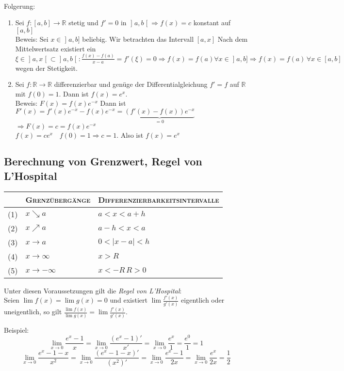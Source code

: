\documentclass[ngerman,titlepage,twoside, parskip=half*]{scrreprt}
\newcommand*{\R}{\mathbb{R}}
\theoremstyle{plain}
\theoremstyle{definition}
\theoremstyle{remark}
\newcommand*{\lsofint}[1]{\mathopen{]}#1]}   %
\newcommand*{\bsofint}[1]{\mathopen{]}#1\mathclose{[}} %
\begin{document}
Folgerung:
\begin{enumerate}[(1)]
  \item Sei $f\colon[a,b]\rightarrow\R$ stetig und $f'=0$ in $\bsofint{a,b}
    \Rightarrow f(x)=c$ konstant auf $[a,b]$\\
    Beweis: Sei $x\in\lsofint{a,b}$ beliebig. Wir betrachten das Intervall $[a,x]$
    Nach dem Mittelwertsatz existiert ein $\xi\in\bsofint{a,x}\subset\bsofint{a,b}\colon
    \frac{f(x)-f(a)}{x-a}=f'(\xi)=0\Rightarrow f(x)=f(a) \forall x\in
    \lsofint{a,b}\Rightarrow f(x)=f(a)\,\forall x\in[a,b]$ wegen der Stetigkeit.
  \item Sei $f\colon\R\rightarrow\R$ differenzierbar und genüge der
    Differentialgleichung $f'=f$ auf $\R$ mit $f(0)=1$. Dann ist
    $f(x)=e^x$.\\
    Beweis: $F(x)=f(x)e^{-x}$ Dann ist $F'(x)=f'(x)e^{-x}-f(x)e^{-x}=
    \underbrace{(f'(x)-f(x))e^{-x}}_{=0}$\\
    $\Rightarrow F(x)=c=f(x)e^{-x}$\\
    $f(x)=ce^x\quad f(0)=1\Rightarrow c=1$. Also ist $f(x)=e^x$
\end{enumerate}

\subsection{Berechnung von Grenzwert, Regel von L'Hospital}
\begin{tabular}{c|l|l}
  & \textsc{Grenzübergänge} & \textsc{Differenzierbarkeitsintervalle}\\
  \hline
  (1) & $x\searrow a$ & $a<x<a+h$\\
  (2) & $x\nearrow a$ & $a-h<x<a$\\
  (3) & $x\rightarrow a$ & $0<|x-a|<h$\\
  (4) & $x\rightarrow\infty$ & $ x>R$\\
  (5) & $x\rightarrow -\infty$ & $x<-R\,R>0$
\end{tabular}

Unter diesen Voraussetzungen gilt die \emph{Regel von L'Hospital}:\\
Seien $\lim f(x)=\lim g(x)=0$ und existiert $\lim \frac{f'(x)}{g'(x)}$
eigentlich oder uneigentlich, so gilt $\frac{\lim f(x)}{\lim g(x)}=\lim
\frac{f'(x)}{g'(x)}$.

Beispiel: \[\lim_{x\rightarrow 0} \frac{e^x-1}{x}=\lim_{x\rightarrow 0}
\frac{(e^x-1)'}{x'}
=\lim_{x\rightarrow 0} \frac{e^x}{1}=\frac{e^0}{1}=1\]
\[\lim_{x\rightarrow 0} \frac{e^x-1-x}{x^2}=\lim_{x\rightarrow 0}
\frac{(e^x-1-x)'}{(x^2)'}=\lim_{x\rightarrow 0}\frac{e^x-1}{2x}=
\lim_{x\rightarrow 0}\frac{e^x}{2x}=\frac{1}{2}\]
\end{document}
